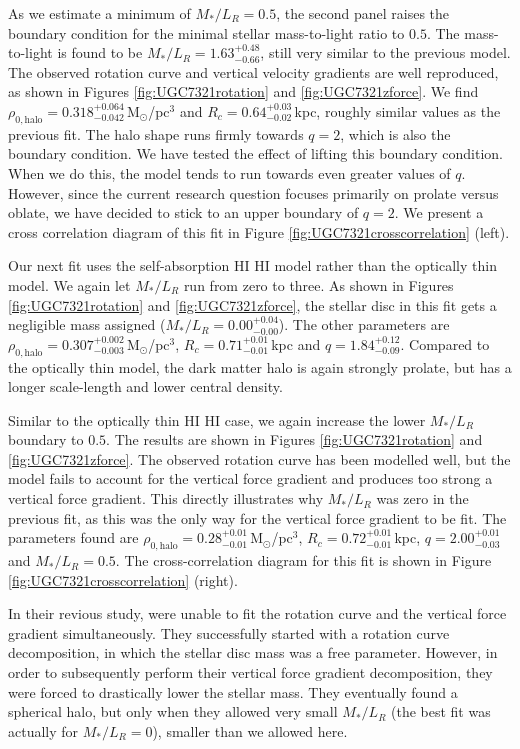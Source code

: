 \documentclass[useAMS,usenatbib]{mn2e}
\newcommand{\hi}{%
  \relax
  \ifmmode
    \textrm{\textsc{HI}}
  \else
    \textsc{H{\smaller}I}
  \fi
}
\begin{document}
As we estimate a minimum of $M_*/L_{R}=0.5$, the second panel raises the 
boundary condition for the minimal stellar mass-to-light ratio to $0.5$.
The mass-to-light is found to be $M_*/L_{R}= 1.63_{-0.66}^{+0.48}$, still very 
similar to the previous model.
The observed rotation curve and vertical velocity gradients are  well 
reproduced, as shown in Figures \ref{fig:UGC7321rotation} and 
\ref{fig:UGC7321zforce}.
We find  $\rho_{0,\textrm{halo}} = 0.318_{-0.042}^{+0.064}$\,M$_\odot$/pc$^3$ 
and $R_c = 0.64_{-0.02}^{+0.03}$\,kpc, roughly similar values as the previous fit. 
The halo shape runs firmly towards $q=2$, which is also the boundary condition. 
We have tested the effect of lifting this boundary condition.
When we do this, the model tends to run towards even greater values of $q$.
However, since the current research question focuses primarily on prolate 
versus oblate, we have decided to stick to an upper boundary of $q=2$.
We present a cross correlation diagram of this fit in 
Figure \ref{fig:UGC7321crosscorrelation} (left).

Our next fit uses the self-absorption \hi model 
rather than the optically thin model.
We again let $M_*/L_{R}$ run from zero to three. 
As shown in Figures \ref{fig:UGC7321rotation} and 
\ref{fig:UGC7321zforce}, the stellar disc in this 
fit gets a negligible mass assigned ($M_*/L_{R}= 0.00_{-0.00}^{+0.04}$).
The other parameters are 
$\rho_{0,\textrm{halo}} =0.307_{-0.003}^{+0.002}$\,M$_\odot$/pc$^3$, $R_c = 0.71_{-0.01}^{+0.01}$\,kpc and $q=1.84_{-0.09}^{+0.12}$.
Compared to the optically thin model, the dark matter halo is again strongly 
prolate, but has a longer scale-length and lower central density.

Similar to the optically thin \hi case, we again increase the lower 
$M_*/L_{R}$ boundary to $0.5$.
The results are shown in Figures \ref{fig:UGC7321rotation} and 
\ref{fig:UGC7321zforce}.
The observed rotation curve has been modelled well, but the model fails to 
account for the vertical force gradient and produces too strong a vertical 
force gradient.
This directly illustrates why $M_*/L_{R}$ was zero in the previous fit, as 
this was the only way for the vertical force gradient to be fit.
The parameters found are 
$\rho_{0,\textrm{halo}} = 0.28_{-0.01}^{+0.01}$\,M$_\odot$/pc$^3$, $R_c =0.72_{-0.01}^{+0.01}$\,kpc, $q=2.00_{-0.03}^{+0.01}$ and $M_*/L_{R}=0.5$.
The cross-correlation diagram for this fit is shown in Figure 
\ref{fig:UGC7321crosscorrelation} (right).\label{sec:UGC7321-decomposition}

In their revious study, \citet{OBrien2010D} 
were unable to  fit the rotation curve and the vertical force gradient 
simultaneously. 
They successfully started with a  rotation curve decomposition, in which 
the stellar disc mass was a free parameter.
However, in order to subsequently perform their vertical force gradient 
decomposition, they were forced to drastically lower the stellar mass.
They eventually found a spherical halo, but only when they allowed very small
$M_*/L_{R}$ (the best fit was actually for $M_*/L_{R}=0$), smaller than we 
allowed here.
\end{document}
